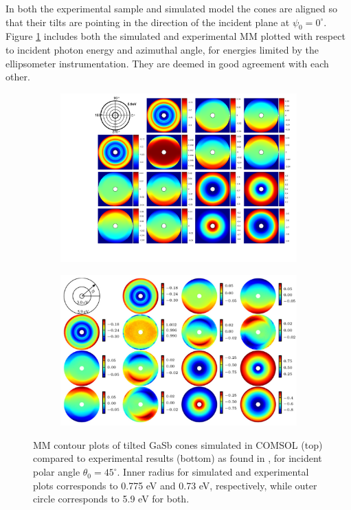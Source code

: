 In both the experimental sample and simulated model the cones are aligned so that their tilts are pointing in the direction of the incident plane at $\psi_0=0^\circ$. Figure \ref{fig:gasb_contour_MM_simvsexp} includes both the simulated and experimental MM plotted with respect to incident photon energy and azimuthal angle, for energies limited by the ellipsometer instrumentation. They are deemed in good agreement with each other. 
\begin{figure}
    \begin{subfigure}{\textwidth}
        \centering
        \includegraphics[width=\linewidth, trim=3.6cm 1.5cm 0cm 0cm, clip]{figures/ch4/gasb/contour/GaSbCones_contour_MM.pdf}   
    \end{subfigure}
    
    \begin{subfigure}{\textwidth}
        \centering
        \includegraphics[width=0.9\linewidth]{figures/ch4/gasb/expdata/GasB_exp_contour_MM_theta45.PNG}  
    \end{subfigure}
    \caption{MM contour plots of tilted GaSb cones simulated in COMSOL (top) compared to experimental results (bottom) as found in \cite{gasbcones}, for incident polar angle $\theta_0=45^\circ$. Inner radius for simulated and experimental plots corresponds to 0.775 eV and 0.73 eV, respectively, while outer circle corresponds to 5.9 eV for both.} %
    \label{fig:gasb_contour_MM_simvsexp}
\end{figure}
